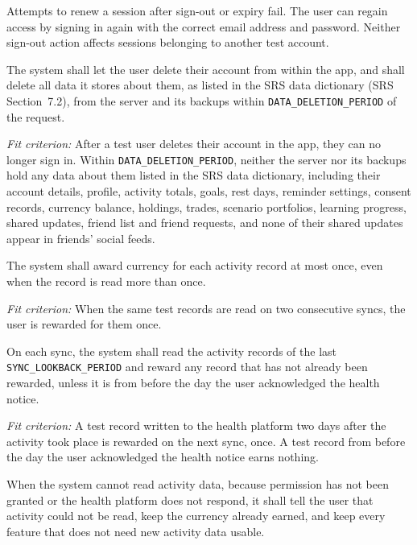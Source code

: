 \documentclass[12pt]{article}
\begin{document}
\begin{description}
Attempts to renew a session after sign-out or expiry fail. The user can
regain access by signing in again with the correct email address and
password. Neither sign-out action affects sessions belonging to another
test account.

\item[SEC-18 (In-app account deletion).] The system shall let the user delete their account from within the app, and
shall delete all data it stores about them, as listed in the SRS data
dictionary (SRS Section~7.2), from the server and its backups within
\texttt{DATA\_DELETION\_PERIOD} of the request.

\textit{Fit criterion:} After a test user deletes their account in the app,
they can no longer sign in. Within \texttt{DATA\_DELETION\_PERIOD}, neither
the server nor its backups hold any data about them listed in the SRS data
dictionary, including their account details, profile, activity totals, goals,
rest days, reminder settings, consent records, currency balance, holdings,
trades, scenario portfolios, learning progress, shared updates, friend list
and friend requests, and none of their shared updates appear in friends'
social feeds.

\item[SEC-19 (Count each activity once).] The system shall award currency for each activity record at most once, even
when the record is read more than once.

\textit{Fit criterion:} When the same test records are read on two consecutive
syncs, the user is rewarded for them once.

\item[SEC-20 (Catch late activity).] On each sync, the system shall read the activity records of the last
\texttt{SYNC\_LOOKBACK\_PERIOD} and reward any record that has not already
been rewarded, unless it is from before the day the user acknowledged the health
notice.

\textit{Fit criterion:} A test record written to the health platform two days
after the activity took place is rewarded on the next sync, once. A test record
from before the day the user acknowledged the health notice earns nothing.

\item[SEC-21 (Activity unavailable).] When the system cannot read activity data, because permission has not been
granted or the health platform does not respond, it shall tell the user that
activity could not be read, keep the currency already earned, and keep every
feature that does not need new activity data usable.


\end{description}
\end{document}
